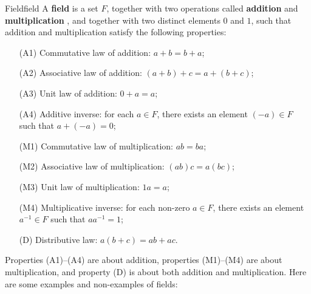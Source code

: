 \begin{definition}{Field}{field}
  A \textbf{field} is a set $F$, together with two
  operations called \textbf{addition}%
   and
  \textbf{multiplication}%
  , and
  together with two distinct elements $0$ and $1$, such that addition
  and multiplication satisfy the following properties:
  \begin{itemize}
  \item[(A1)] {Commutative law of addition:} $a+b=b+a$;
  \item[(A2)] {Associative law of addition:} $(a+b)+c = a+(b+c)$;
  \item[(A3)] {Unit law of addition:} $0+a = a$;
  \item[(A4)] {Additive inverse:} for each $a\in F$, there exists an element $(-a)\in F$ such that $a+(-a)=0$;
  \item[(M1)] {Commutative law of multiplication:} $ab=ba$;
  \item[(M2)] {Associative law of multiplication:} $(ab)c=a(bc)$;
  \item[(M3)] {Unit law of multiplication:} $1a=a$;
  \item[(M4)] {Multiplicative inverse:} for each non-zero $a\in F$, there exists an element $a^{-1}\in F$ such that $aa^{-1}=1$;
  \item[(D)] {Distributive law:} $a(b+c)=ab+ac$.
  \end{itemize}
\end{definition}

Properties (A1)--(A4) are about addition, properties (M1)--(M4) are
about multiplication, and property (D) is about both addition and
multiplication. Here are some examples and non-examples of fields:

